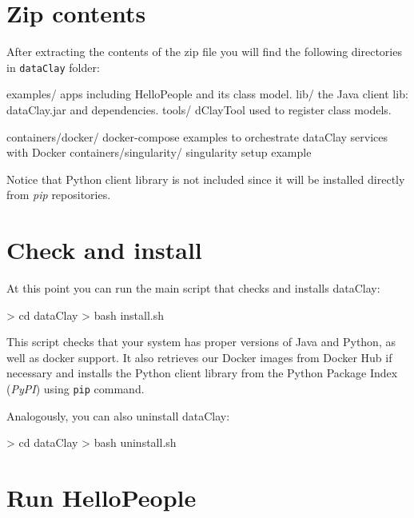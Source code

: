 \section{Zip contents}

After extracting the contents of the zip file you will find the following directories in \texttt{dataClay} folder:
\begin{tBox}
\begin{bash}
  examples/  apps including HelloPeople and its class model.
  lib/       the Java client lib: dataClay.jar and dependencies.
  tools/     dClayTool used to register class models.
  
  containers/docker/         docker-compose examples to orchestrate dataClay services with Docker
  containers/singularity/    singularity setup example
\end{bash}
\end{tBox}

Notice that Python client library is not included since it will be installed directly from \textit{pip} repositories.

\section{Check and install}

At this point you can run the main script that checks and installs dataClay:

\begin{tBox}
 \begin{bash}
  > cd dataClay
  > bash install.sh
 \end{bash}
\end{tBox}

This script checks that your system has proper versions of Java and Python, as well as docker support. It also retrieves our Docker images from Docker Hub if necessary and installs the Python client library from the Python Package Index (\textit{PyPI}) using \texttt{pip} command.

Analogously, you can also uninstall dataClay:
\begin{tBox}
 \begin{bash}
  > cd dataClay
  > bash uninstall.sh
 \end{bash}
\end{tBox}

\section{Run HelloPeople}

